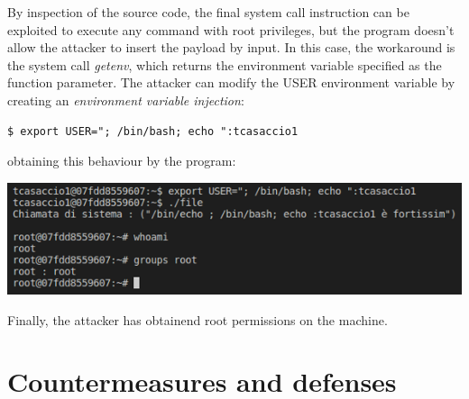 \documentclass[a4paper, 12pt, oneside]{extbook}
\begin{document}
By inspection of the source code, the final system call instruction can be exploited to 
execute any command with root privileges, but the program doesn't allow the attacker to insert the 
payload by input. In this case, the workaround is the system call \textit{getenv}, which returns the environment 
variable specified as the function parameter. The attacker can modify the USER environment variable 
by creating an \textit{environment variable injection}:
\begin{lstlisting}[style=DOS]
$ export USER="; /bin/bash; echo ":tcasaccio1
\end{lstlisting}
obtaining this behaviour by the program:
\begin{center}
  \includegraphics[scale=0.9]{../Image/privilege_escalation_exploit.PNG}
\end{center}
Finally, the attacker has obtainend root permissions on the machine.



\chapter{Countermeasures and defenses}
\end{document}
